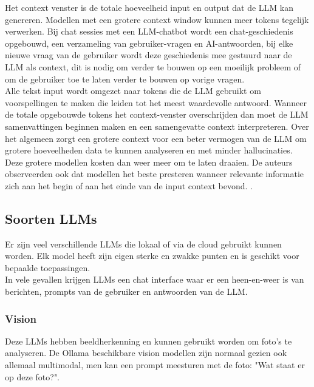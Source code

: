 Het context venster is de totale hoeveelheid input en output dat de LLM kan genereren. Modellen met een grotere context window kunnen meer tokens tegelijk verwerken. Bij chat sessies met een LLM-chatbot wordt een chat-geschiedenis opgebouwd, een verzameling van gebruiker-vragen en AI-antwoorden, bij elke nieuwe vraag van de gebruiker wordt deze geschiedenis mee gestuurd naar de LLM als context, dit is nodig om verder te bouwen op een moeilijk probleem of om de gebruiker toe te laten verder te bouwen op vorige vragen. \\

Alle tekst input wordt omgezet naar tokens die de LLM gebruikt om voorspellingen te maken die leiden tot het meest waardevolle antwoord. Wanneer de totale opgebouwde tokens het context-venster overschrijden dan moet de LLM samenvattingen beginnen maken en een samengevatte context interpreteren. Over het algemeen zorgt een grotere context voor een beter vermogen van de LLM om grotere hoeveelheden data te kunnen analyseren en met minder hallucinaties. Deze grotere modellen kosten dan weer meer om te laten draaien. De auteurs observeerden ook dat modellen het beste presteren wanneer relevante informatie zich aan het begin of aan het einde van de input context bevond. \autocite{Bergmann}.


\subsection{Soorten LLMs}
\label{ssec:soortenllms}
Er zijn veel verschillende LLMs die lokaal of via de cloud gebruikt kunnen worden. Elk model heeft zijn eigen sterke en zwakke punten en is geschikt voor bepaalde toepassingen. \\

In vele gevallen krijgen LLMs een chat interface waar er een heen-en-weer is van berichten, prompts van de gebruiker en antwoorden van de LLM.

\subsubsection{Vision}
\label{sssec:vision}
Deze LLMs hebben beeldherkenning en kunnen gebruikt worden om foto's te analyseren. De Ollama beschikbare vision modellen zijn normaal gezien ook allemaal multimodal, men kan een prompt meesturen met de foto: "Wat staat er op deze foto?".

